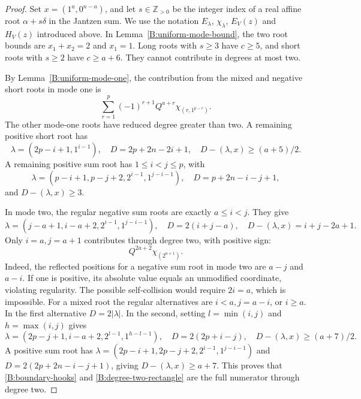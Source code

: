 \documentclass[11pt,a4paper]{amsart}
\numberwithin{equation}{section}
\theoremstyle{definition}
\theoremstyle{remark}
\newcommand{\Z}{\mathbb Z}
\begin{document}
\begin{proof}
Set $x=(1^a,0^{n-a})$, and let $s\in\Z_{>0}$ be the integer
index of a real affine root $\alpha+s\delta$ in the Jantzen sum.
We use the notation $E_\lambda$, $\chi_\lambda$, $E_V(z)$ and
$H_V(z)$ introduced above. In Lemma~\ref{B:uniform-mode-bound},
the two root bounds are $x_1+x_2=2$ and $x_1=1$.
Long roots with $s\geq3$ have $c\geq5$, and short
roots with $s\geq2$ have $c\geq a+6$. They cannot contribute in
degrees at most two.

By Lemma~\ref{B:uniform-mode-one}, the contribution from the mixed
and negative short roots in mode one is
\begin{equation}\label{B:boundary-hooks}
 \sum_{r=1}^{p}(-1)^{r+1}Q^{a+r}\chi_{(r,1^{p-r})}.
\end{equation}
The other mode-one roots have reduced degree greater than two.
A remaining positive short root has
$$
 \lambda=(2p-i+1,1^{i-1}),\quad D=2p+2n-2i+1,
 \quad D-(\lambda,x)\geq(a+5)/2.
$$
A remaining positive sum root has $1\leq i<j\leq p$, with
$$
 \lambda=(p-i+1,p-j+2,2^{i-1},1^{j-i-1}),\quad
 D=p+2n-i-j+1,
$$
and $D-(\lambda,x)\geq3$.

In mode two, the regular negative sum roots are exactly $a\leq i<j$.
They give
\begin{equation}\label{B:mode-two}
 \lambda=(j-a+1,i-a+2,2^{i-1},1^{j-i-1}),\quad
 D=2(i+j-a),\quad D-(\lambda,x)=i+j-2a+1.
\end{equation}
Only $i=a,j=a+1$ contributes through degree two, with positive sign:
\begin{equation}\label{B:degree-two-rectangle}
                    Q^{2a+2}\chi_{(2^{a+1})}.
\end{equation}
Indeed, the reflected positions for a negative sum
root in mode two are $a-j$ and $a-i$. If one is positive, its absolute
value equals an unmodified coordinate, violating regularity. The possible self-collision would require
$2i=a$, which is impossible. For a mixed root the regular alternatives
are $i<a,j=a-i$, or $i\geq a$. In the first alternative $D=2|\lambda|$.
In the second, setting $l=\min(i,j)$ and $h=\max(i,j)$ gives
$$
 \lambda=(2p-j+1,i-a+2,2^{l-1},1^{h-l-1}),
 \quad D=2(2p+i-j),\quad
 D-(\lambda,x)\geq(a+7)/2.
$$
A positive sum root has
$\lambda=(2p-i+1,2p-j+2,2^{i-1},1^{j-i-1})$ and
$D=2(2p+2n-i-j+1)$, giving $D-(\lambda,x)\geq a+7$.
This proves that \eqref{B:boundary-hooks} and
\eqref{B:degree-two-rectangle} are the full numerator through
degree two.


\end{proof}
\end{document}
